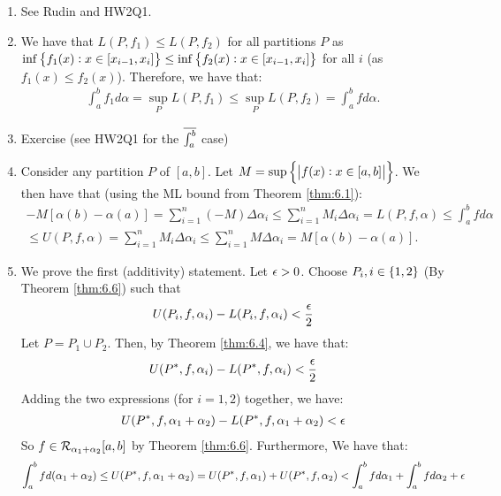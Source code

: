 \begin{nproof}
    \begin{enumerate}
        \item See Rudin and HW2Q1.
        \item We have that $L(P, f_1) \leq L(P, f_2)$ for all partitions $P$ as $\inf\set{f_1(x): x \in [x_{i-1}, x_i]} \leq \inf\set{f_2(x): x \in [x_{i-1}, x_i]}$ for all $i$ (as $f_1(x) \leq f_2(x)$). Therefore, we have that:
        \begin{align*}
            \int_a^b f_1 d\alpha = \sup_P L(P, f_1) \leq \sup_P L(P, f_2) = \int_a^b f d\alpha.
        \end{align*}
        \item Exercise (see HW2Q1 for the $\overline{\int_{a}^{b}}$ case)
        \item Consider any partition $P$ of $[a, b]$. Let $M = \sup\set{\abs{f(x): x \in [a, b]}}$. We then have that (using the ML bound from Theorem \ref{thm:6.1}):
        \begin{align*}
            -M[\alpha(b) - \alpha(a)] = \sum_{i=1}^n(-M)\Delta \alpha_i \leq \sum_{i=1}^n M_i \Delta \alpha_i = L(P, f, \alpha) \leq \int_a^b fd\alpha 
            \\ \leq U(P, f, \alpha) = \sum_{i=1}^n M_i \Delta \alpha_i \leq \sum_{i=1}^n M\Delta \alpha_i = M[\alpha(b) - \alpha(a)].
        \end{align*}
        \item We prove the first (additivity) statement. Let $\epsilon > 0$. Choose $P_i, i \in \set{1, 2}$ (By Theorem \ref{thm:6.6}) such that \begin{align*}
            U(P_i, f, \alpha_i) - L(P_i, f, \alpha_i) < \frac{\epsilon}{2} 
        \end{align*}   
        Let $P = P_1 \cup P_2$. Then, by Theorem \ref{thm:6.4}, we have that:
        \begin{align*}
            U(P^*, f, \alpha_i) - L(P^*, f, \alpha_i) < \frac{\epsilon}{2}
        \end{align*}
        Adding the two expressions (for $i = 1, 2$) together, we have:
        \begin{align*}
            U(P^*, f, \alpha_1 + \alpha_2) - L(P^*, f, \alpha_1 + \alpha_2) < \epsilon
        \end{align*}
        So $f \in \mathcal{R}_{\alpha_1 + \alpha_2}[a, b]$ by Theorem \ref{thm:6.6}. Furthermore, We have that:
        \begin{align*}
            \int_a^b f d(\alpha_1 + \alpha_2) \leq U(P^*, f, \alpha_1 + \alpha_2) = U(P^*, f, \alpha_1) + U(P^*, f, \alpha_2) < \int_a^b f d\alpha_1 + \int_a^b fd\alpha_2 + \e

\end{align*}
\end{enumerate}
\end{nproof}
